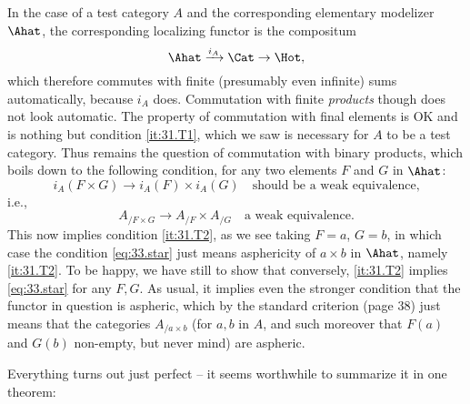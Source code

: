 In the case of a test category $A$ and the corresponding elementary
modelizer $\Ahat$, the corresponding localizing functor is the
compositum
\[ \Ahat \xrightarrow{i_A} \Cat\to\Hot,\]
which therefore commutes with finite (presumably even infinite) sums
automatically, because $i_A$ does. Commutation with finite
\emph{products} though does not look automatic. The property of
commutation with final elements is OK and is nothing but condition
\ref{it:31.T1}, which we saw is necessary for $A$ to be a test
category. Thus remains the question of commutation with binary
products, which boils down to the following condition, for any two
elements $F$ and $G$ in $\Ahat$:
\[ i_A(F\times G) \to i_A(F) \times i_A(G) \quad\text{should be a weak
  equivalence,}\]
i.e.,
\begin{equation}
  \label{eq:33.star}
  A_{/F\times G} \to A_{/F} \times A_{/G} \quad\text{a weak equivalence.}
  \tag{*}
\end{equation}
This now implies condition \ref{it:31.T2}, as we see taking $F=a$,
$G=b$, in which case the condition \eqref{eq:33.star} just means
asphericity of $a\times b$ in $\Ahat$, namely \ref{it:31.T2}. To
be happy, we have still to show that conversely, \ref{it:31.T2}
implies \eqref{eq:33.star} for any $F,G$. As usual, it implies even
the stronger condition that the functor in question is aspheric, which
by the standard criterion (page 38) just means that the categories
$A_{/a\times b}$ (for $a,b$ in $A$, and such moreover that $F(a)$ and
$G(b)$ non-empty, but never mind) are aspheric.

Everything turns out just perfect -- it seems worthwhile to summarize
it in one theorem:


